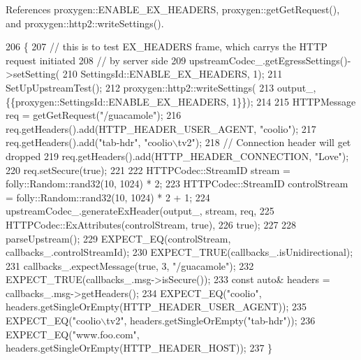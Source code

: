 References proxygen\+::\+E\+N\+A\+B\+L\+E\+\_\+\+E\+X\+\_\+\+H\+E\+A\+D\+E\+RS, proxygen\+::get\+Get\+Request(), and proxygen\+::http2\+::write\+Settings().


\begin{DoxyCode}
206                                           \{
207   \textcolor{comment}{// this is to test EX\_HEADERS frame, which carrys the HTTP request initiated}
208   \textcolor{comment}{// by server side}
209   upstreamCodec\_.getEgressSettings()->setSetting(
210       SettingsId::ENABLE\_EX\_HEADERS, 1);
211   SetUpUpstreamTest();
212   proxygen::http2::writeSettings(
213       output\_, \{\{proxygen::SettingsId::ENABLE_EX_HEADERS, 1\}\});
214 
215   HTTPMessage req = getGetRequest(\textcolor{stringliteral}{"/guacamole"});
216   req.getHeaders().add(HTTP\_HEADER\_USER\_AGENT, \textcolor{stringliteral}{"coolio"});
217   req.getHeaders().add(\textcolor{stringliteral}{"tab-hdr"}, \textcolor{stringliteral}{"coolio\(\backslash\)tv2"});
218   \textcolor{comment}{// Connection header will get dropped}
219   req.getHeaders().add(HTTP\_HEADER\_CONNECTION, \textcolor{stringliteral}{"Love"});
220   req.setSecure(\textcolor{keyword}{true});
221 
222   HTTPCodec::StreamID stream = folly::Random::rand32(10, 1024) * 2;
223   HTTPCodec::StreamID controlStream = folly::Random::rand32(10, 1024) * 2 + 1;
224   upstreamCodec\_.generateExHeader(output\_, stream, req,
225                                   HTTPCodec::ExAttributes(controlStream, \textcolor{keyword}{true}),
226                                   \textcolor{keyword}{true});
227 
228   parseUpstream();
229   EXPECT\_EQ(controlStream, callbacks\_.controlStreamId);
230   EXPECT\_TRUE(callbacks\_.isUnidirectional);
231   callbacks\_.expectMessage(\textcolor{keyword}{true}, 3, \textcolor{stringliteral}{"/guacamole"});
232   EXPECT\_TRUE(callbacks\_.msg->isSecure());
233   \textcolor{keyword}{const} \textcolor{keyword}{auto}& headers = callbacks\_.msg->getHeaders();
234   EXPECT\_EQ(\textcolor{stringliteral}{"coolio"}, headers.getSingleOrEmpty(HTTP\_HEADER\_USER\_AGENT));
235   EXPECT\_EQ(\textcolor{stringliteral}{"coolio\(\backslash\)tv2"}, headers.getSingleOrEmpty(\textcolor{stringliteral}{"tab-hdr"}));
236   EXPECT\_EQ(\textcolor{stringliteral}{"www.foo.com"}, headers.getSingleOrEmpty(HTTP\_HEADER\_HOST));
237 \}
\end{DoxyCode}
